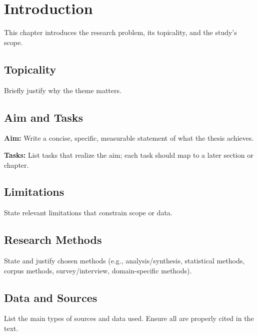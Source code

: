 \chapter{Introduction}

This chapter introduces the research problem, its topicality, and the study's scope.

\section{Topicality}
Briefly justify why the theme matters.

\section{Aim and Tasks}
\textbf{Aim:} Write a concise, specific, measurable statement of what the thesis achieves.

\textbf{Tasks:} List tasks that realize the aim; each task should map to a later section or chapter.

\section{Limitations}
State relevant limitations that constrain scope or data.

\section{Research Methods}
State and justify chosen methods (e.g., analysis/synthesis, statistical methods, corpus methods, survey/interview, domain-specific methods).

\section{Data and Sources}
List the main types of sources and data used. Ensure all are properly cited in the text.

